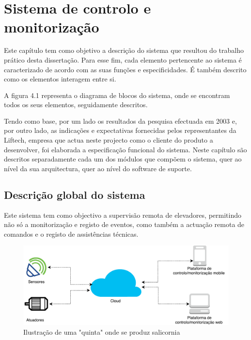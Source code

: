 

\chapter{Sistema de controlo e monitorização}


Este capítulo tem como objetivo a descrição do sistema que resultou do trabalho prático
desta dissertação. Para esse fim, cada elemento pertencente ao sistema é caracterizado de
acordo com as suas funções e especificidades. É também descrito como os elementos interagem
entre si.

A figura 4.1 representa o diagrama de blocos do sistema, onde se encontram todos os seus
elementos, seguidamente descritos.




Tendo como base, por um lado os resultados da pesquisa efectuada em 2003 e, por outro lado, as
indicações e expectativas fornecidas pelos representantes da Liftech, empresa que actua neste
projecto como o cliente do produto a desenvolver, foi elaborada a especificação funcional do
sistema.
Neste capítulo são descritos separadamente cada um dos módulos que compõem o sistema, quer
ao nível da sua arquitectura, quer ao nível do software de suporte.


\section{Descrição global do sistema}



Este sistema tem como objectivo a supervisão remota de elevadores, permitindo não só a
monitorização e registo de eventos, como também a actuação remota de comandos e o registo de
assistências técnicas.


\begin{figure}[!htb]
	\centering
	\includegraphics[scale=0.45]{esquemas/global_arquitetura.pdf}
	\caption{Ilustração de uma "quinta" onde se produz salicornia}
	\label{dikw}
\end{figure}







